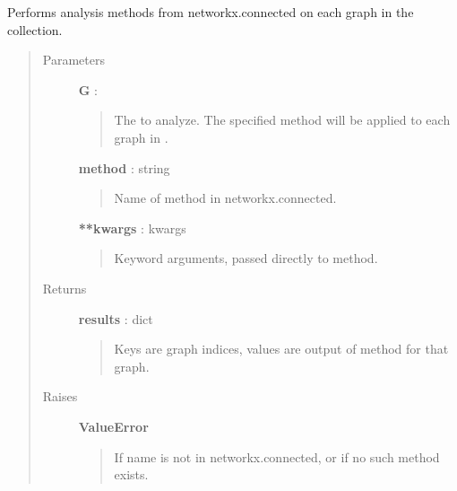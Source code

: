 \documentclass[letterpaper,10pt,english]{sphinxmanual}
\begin{document}

\begin{fulllineitems}
\label{tethne.analyze.collection:tethne.analyze.collection.connected}
Performs analysis methods from networkx.connected on each graph in the
collection.
\begin{quote}\begin{description}
\item[{Parameters}] \leavevmode
\textbf{G} : {\hyperref[tethne.classes.graphcollection:tethne.classes.graphcollection.GraphCollection]{}}
\begin{quote}

The {\hyperref[tethne.classes.graphcollection:tethne.classes.graphcollection.GraphCollection]{}} to analyze. The specified method will be
applied to each graph in .
\end{quote}

\textbf{method} : string
\begin{quote}

Name of method in networkx.connected.
\end{quote}

\textbf{**kwargs} : kwargs
\begin{quote}

Keyword arguments, passed directly to method.
\end{quote}

\item[{Returns}] \leavevmode
\textbf{results} : dict
\begin{quote}

Keys are graph indices, values are output of method for that graph.
\end{quote}

\item[{Raises}] \leavevmode
\textbf{ValueError}
\begin{quote}

If name is not in networkx.connected, or if no such method exists.
\end{quote}

\end{description}\end{quote}

\end{fulllineitems}

\end{document}
